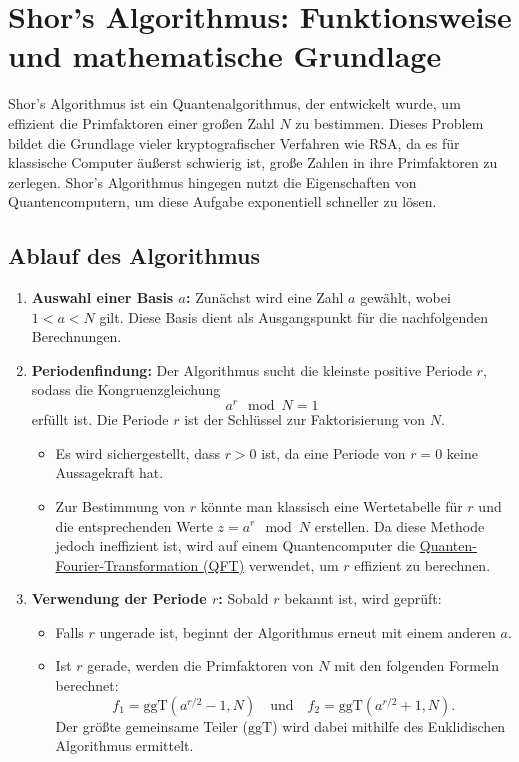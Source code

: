 \section{Shor’s Algorithmus: Funktionsweise und mathematische Grundlage}
\label{sec:shor}

Shor’s Algorithmus ist ein Quantenalgorithmus, der entwickelt wurde, um 
effizient die Primfaktoren einer großen Zahl $N$ zu bestimmen. Dieses 
Problem bildet die Grundlage vieler kryptografischer Verfahren wie RSA, 
da es für klassische Computer äußerst schwierig ist, große Zahlen in 
ihre Primfaktoren zu zerlegen. Shor’s Algorithmus hingegen nutzt die 
Eigenschaften von Quantencomputern, um diese Aufgabe exponentiell 
schneller zu lösen. \cite{shor}

\subsection{Ablauf des Algorithmus}

\begin{enumerate}
    \item \textbf{Auswahl einer Basis $a$:}  
    Zunächst wird eine Zahl $a$ gewählt, wobei $1 < a < N$ gilt. Diese 
    Basis dient als Ausgangspunkt für die nachfolgenden Berechnungen.

    \item \textbf{Periodenfindung:}  
    Der Algorithmus sucht die kleinste positive Periode $r$, sodass die 
    Kongruenzgleichung  
    \[
    a^r \mod N = 1
    \]  
    erfüllt ist. Die Periode $r$ ist der Schlüssel zur Faktorisierung von $N$.  
    \begin{itemize}
        \item Es wird sichergestellt, dass $r > 0$ ist, da eine Periode von 
        $r = 0$ keine Aussagekraft hat.
        \item Zur Bestimmung von $r$ könnte man klassisch eine Wertetabelle 
        für $r$ und die entsprechenden Werte $z = a^r \mod N$ erstellen. Da 
        diese Methode jedoch ineffizient ist, wird auf einem Quantencomputer 
        die \hyperref[sec:QFT]{Quanten-Fourier-Transformation (QFT)} verwendet, um $r$ effizient 
        zu berechnen.
    \end{itemize}

    \item \textbf{Verwendung der Periode $r$:}  
    Sobald $r$ bekannt ist, wird geprüft:  
    \begin{itemize}
        \item Falls $r$ ungerade ist, beginnt der Algorithmus erneut mit 
        einem anderen $a$.
        \item Ist $r$ gerade, werden die Primfaktoren von $N$ mit den 
        folgenden Formeln berechnet:  
        \[
        f_1 = \text{ggT}\left(a^{r/2} - 1, N\right) \quad \text{und} \quad f_2 = \text{ggT}\left(a^{r/2} + 1, N\right).
        \]  
        Der größte gemeinsame Teiler ($\text{ggT}$) wird dabei mithilfe 
        des Euklidischen Algorithmus ermittelt. \cite{shor_klassisch} \cite{shor_klassisch2} 
    \end{itemize}
\end{enumerate}



